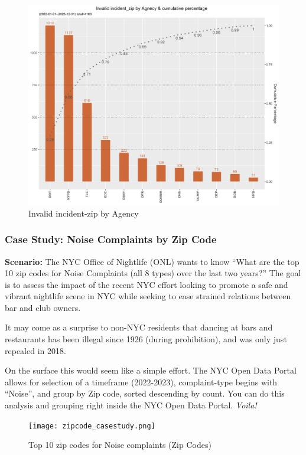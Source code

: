 \documentclass[12pt, titlepage]{article}
\begin{document}
	\begin{figure}[H]
	  \centering
		  \includegraphics[width=\textwidth]{invalid_incident_zip.png}
		  \caption{Invalid incident-zip by Agency}
		  \label{fig:invalid_incident_zip}
	\end{figure}
	
		\subsubsection{Case Study: Noise Complaints by Zip Code}
		\textbf{Scenario:} The NYC Office of Nightlife (ONL) wants to know ``What are the top 10 zip codes for Noise Complaints (all 8 types) over the last two years?''
		The goal is to assess the impact of the recent NYC effort looking to promote a safe and vibrant nightlife scene in NYC while seeking to ease
		strained relations between bar and club owners. 
		
		It may come as a surprise to non-NYC residents that dancing at bars and restaurants has been illegal since 1926 (during prohibition), and was only just repealed in 2018. 
		
		On the surface this would seem like a simple effort.  The NYC Open Data Portal allows for selection of a timeframe (2022-2023), complaint-type
		begins with ``Noise'', and group by Zip code, sorted descending by count.  You can do this analysis and grouping right inside the NYC Open Data Portal. \textit{Voila!}

	\begin{figure}[H]
	    		\centering
	    		\texttt{[image: zipcode\_casestudy.png]}
	    		\caption{Top 10 zip codes for Noise complaints (Zip Codes)}
	    	\label{fig:casestudy1-zipcodes}
		\end{figure}
	
\end{document}
